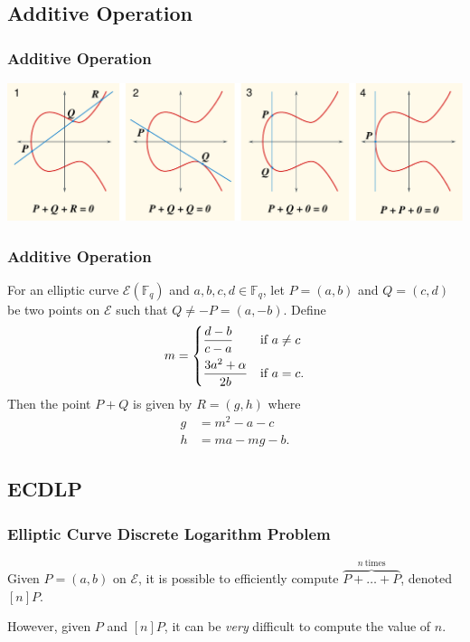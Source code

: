 \documentclass{beamer}
\begin{document}
    \subsection{Additive Operation}
    \begin{frame}
        \frametitle{Additive Operation}
        \hyperlink{points}{}
        \centering
        \includegraphics[width=\textwidth]{ECClines.pdf}
    \end{frame}

    \begin{frame}
        \frametitle{Additive Operation}
        \begin{theorem}
            For an elliptic curve \(\mathcal{E}(\mathbb{F}_q)\)
            and \(a, b, c, d \in \mathbb{F}_q\),
            let \(P = (a, b)\) and \(Q = (c, d)\) be two points
            on \(\mathcal{E}\) such that \(Q \neq -P = (a, -b)\). Define
            \[m =
                \begin{dcases}
                    \frac{d - b}{c - a} & \textnormal{if}\ a \neq c \\
                    \frac{3a^2 + \alpha}{2b} & \textnormal{if}\ a = c.
                \end{dcases}\]
            Then the point \(P + Q\) is given by \(R = (g, h)\) where
            \begin{align*}
                g &= m^2 - a - c \\
                h &= ma - mg - b.
            \end{align*}
        \end{theorem}
        \hyperlink{add}{}
    \end{frame}

    \subsection{ECDLP}
    \begin{frame}
        \frametitle{Elliptic Curve Discrete Logarithm Problem}
        Given \(P = (a, b)\) on \(\mathcal{E}\), it is possible to
        efficiently compute \(\overbrace{P + \dots + P}^{n\ \textrm{times}}\),
        denoted \([n]P\).

        \hyperlink{mul}{}
        \vfill
        However, given \(P\) and \([n]P\), it can be \emph{very} difficult to
        compute the value of \(n\).
    \end{frame}
\end{document}
